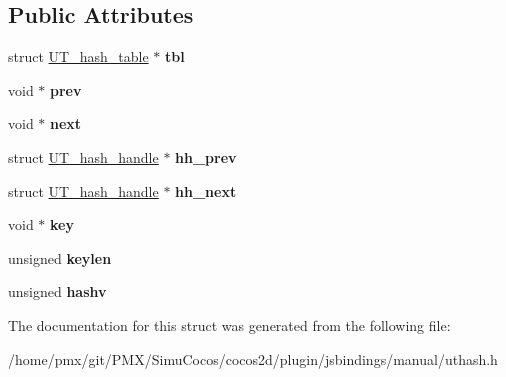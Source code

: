 \subsection*{Public Attributes}
\begin{DoxyCompactItemize}
\item 
\mbox{\label{structUT__hash__handle_ad2035ee3b2aa55b22e352341372a5e73}} 
struct \hyperlink{structUT__hash__table}{U\+T\+\_\+hash\+\_\+table} $\ast$ {\bfseries tbl}
\item 
\mbox{\label{structUT__hash__handle_abaf54a69367933df2d45575f48ca6a58}} 
void $\ast$ {\bfseries prev}
\item 
\mbox{\label{structUT__hash__handle_a93bc88ffe97f85ea0d9e0056b7118942}} 
void $\ast$ {\bfseries next}
\item 
\mbox{\label{structUT__hash__handle_a3ec03e34d7975d5c1981c44b324619b2}} 
struct \hyperlink{structUT__hash__handle}{U\+T\+\_\+hash\+\_\+handle} $\ast$ {\bfseries hh\+\_\+prev}
\item 
\mbox{\label{structUT__hash__handle_a4f6989385499ba6f594b0f0facd28325}} 
struct \hyperlink{structUT__hash__handle}{U\+T\+\_\+hash\+\_\+handle} $\ast$ {\bfseries hh\+\_\+next}
\item 
\mbox{\label{structUT__hash__handle_a40690fc15aeaeba8f25385f05f84dd4d}} 
void $\ast$ {\bfseries key}
\item 
\mbox{\label{structUT__hash__handle_af2abdc405972a6bbdee2ade2c0f346c4}} 
unsigned {\bfseries keylen}
\item 
\mbox{\label{structUT__hash__handle_aae5e635fa110556e5007f627089f8323}} 
unsigned {\bfseries hashv}
\end{DoxyCompactItemize}


The documentation for this struct was generated from the following file\+:\begin{DoxyCompactItemize}
\item 
/home/pmx/git/\+P\+M\+X/\+Simu\+Cocos/cocos2d/plugin/jsbindings/manual/uthash.\+h\end{DoxyCompactItemize}
